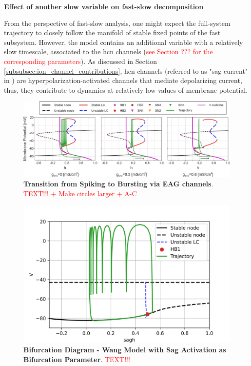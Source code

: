 \documentclass[../main.tex]{subfiles}
\begin{document}
\vspace*{0.3cm}
\noindent\textbf{Effect of another slow variable on fast-slow decomposition}

From the perspective of fast-slow analysis, one might expect the full-system trajectory to closely follow the manifold of stable fixed points of the fast subsystem. However, the model contains an additional variable with a relatively slow timescale, associated to the \gls{hcn} channels (\textcolor{red}{see Section ??? for the corresponding parameters}). As discussed in Section \ref{subsubsec:ion_channel_contributions}, \gls{hcn} channels (referred to as "sag current" in \parencite{wangMultipleDynamicalModes1994}) are hyperpolarization-activated channels that mediate depolarizing current, thus, they contribute to dynamics at relatively low values of membrane potential.

\begin{figure}[!t]
    \centering
    \includegraphics[width=\linewidth]{../img/spiking_to_bursting/bifurcation_wang.png}
    \caption[Transition from Spiking to Bursting via EAG channels]{
        \textbf{Transition from Spiking to Bursting via EAG channels}. \textcolor{red}{TEXT!!! + Make circles larger + A-C}
    }
    \label{fig:spiking_to_bursting_wang_bifurcation}
\end{figure}

\begin{figure}[!t]
    \centering
    \includegraphics[width=0.6\linewidth]{../img/spiking_to_bursting/bifurcation_wang_sagh.png}
    \caption[Bifurcation Diagram - Wang Model with Sag Activation as Bifurcation Parameter]{
        \textbf{Bifurcation Diagram - Wang Model with Sag Activation as Bifurcation Parameter}. \textcolor{red}{TEXT!!!}
    }
    \label{fig:spiking_to_bursting_wang_bifurcation_sagh}
\end{figure}
\end{document}
